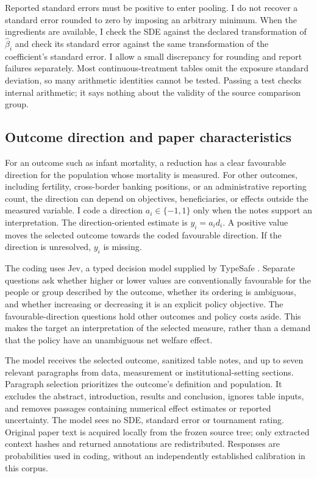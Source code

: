 \documentclass[11pt]{article}
\begin{document}
Reported standard errors must be positive to enter pooling. I do not recover a standard error rounded to zero by imposing an arbitrary minimum. When the ingredients are available, I check the SDE against the declared transformation of $\widehat\beta_i$ and check its standard error against the same transformation of the coefficient's standard error. I allow a small discrepancy for rounding and report failures separately. Most continuous-treatment tables omit the exposure standard deviation, so many arithmetic identities cannot be tested. Passing a test checks internal arithmetic; it says nothing about the validity of the source comparison group.

\subsection{Outcome direction and paper characteristics}
For an outcome such as infant mortality, a reduction has a clear favourable direction for the population whose mortality is measured. For other outcomes, including fertility, cross-border banking positions, or an administrative reporting count, the direction can depend on objectives, beneficiaries, or effects outside the measured variable. I code a direction $a_i\in\{-1,1\}$ only when the notes support an interpretation. The direction-oriented estimate is $y_i=a_i d_i$. A positive value moves the selected outcome towards the coded favourable direction. If the direction is unresolved, $y_i$ is missing.

The coding uses Jev, a typed decision model supplied by TypeSafe \citep{typesafe}. Separate questions ask whether higher or lower values are conventionally favourable for the people or group described by the outcome, whether its ordering is ambiguous, and whether increasing or decreasing it is an explicit policy objective. The favourable-direction questions hold other outcomes and policy costs aside. This makes the target an interpretation of the selected measure, rather than a demand that the policy have an unambiguous net welfare effect.

The model receives the selected outcome, sanitized table notes, and up to seven relevant paragraphs from data, measurement or institutional-setting sections. Paragraph selection prioritizes the outcome's definition and population. It excludes the abstract, introduction, results and conclusion, ignores table inputs, and removes passages containing numerical effect estimates or reported uncertainty. The model sees no SDE, standard error or tournament rating. Original paper text is acquired locally from the frozen source tree; only extracted context hashes and returned annotations are redistributed. Responses are probabilities used in coding, without an independently established calibration in this corpus.
\end{document}
